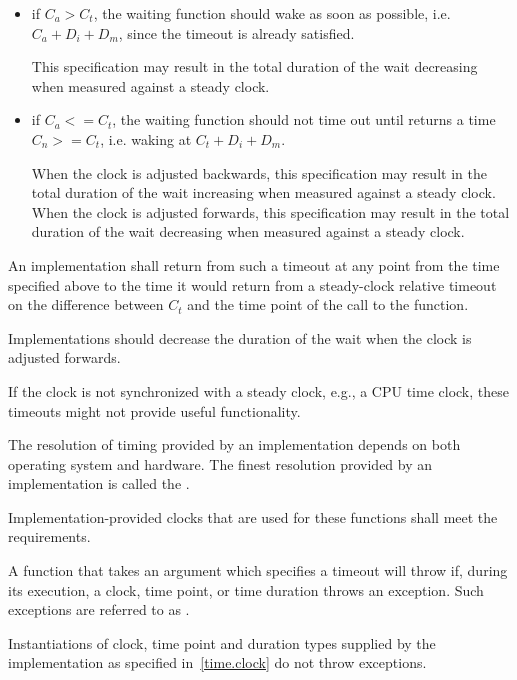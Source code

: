 \begin{itemize}
\item
if $C_a > C_t$, the waiting function should wake as soon as possible, i.e. $C_a + D_i + D_m$,
since the timeout is already satisfied. \begin{note} This specification may result in the total
duration of the wait decreasing when measured against a steady clock. \end{note}

\item
if $C_a <= C_t$, the waiting function should not time out until  returns a
time $C_n >= C_t$, i.e. waking at $C_t + D_i + D_m$. \begin{note} When the clock is adjusted
backwards, this specification may result in the total duration of the wait increasing when
measured against a steady clock. When the clock is adjusted forwards, this specification may
result in the total duration of the wait decreasing when measured against a steady clock.
\end{note}
\end{itemize}

An implementation shall return from such a timeout at any point from the time specified above to
the time it would return from a steady-clock relative timeout on the difference between $C_t$
and the time point of the call to the  function. \begin{note} Implementations
should decrease the duration of the wait when the clock is adjusted forwards.
\end{note}

\pnum
\begin{note} If the clock is not synchronized with a steady clock, e.g., a CPU time clock, these
timeouts might not provide useful functionality. \end{note}

\pnum
The resolution of timing provided by an implementation depends on both operating system
and hardware. The finest resolution provided by an implementation is called the
.

\pnum
Implementation-provided clocks that are used for these functions shall meet the
 requirements.

\pnum
A function that takes an argument which specifies a timeout will throw if,
during its execution, a clock, time point, or time duration throws an exception.
Such exceptions are referred to as .
\begin{note} Instantiations of clock, time point and duration types supplied by
the implementation as specified in~\ref{time.clock} do not throw exceptions.
\end{note}

